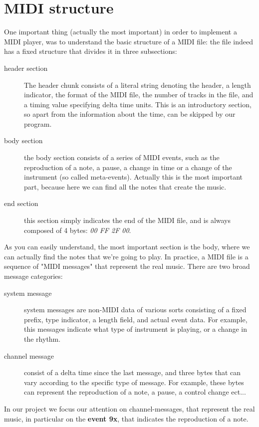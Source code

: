 \documentclass[12pt]{article}
\begin{document}
\section{MIDI structure} \label{sec:structure}
One important thing (actually the most important) in order to implement a MIDI player, was to understand the basic structure of a MIDI file: the file indeed has a fixed structure that divides it in three subsections: 
\begin{description} 
	\item[header section] The header chunk consists of a literal string denoting the header, a length indicator, the format of the MIDI file, the number of tracks in the file, and a timing value specifying delta time units. This is an introductory section, so apart from the information about the time, can be skipped by our program.
	\item[body section] the body section consists of a series of MIDI events, such as the reproduction of a note, a pause, a change in time or a change of the instrument (so called meta-events). Actually this is the most important part, because here we can find all the notes that create the music.
	\item[end section] this section simply indicates the end of the MIDI file, and is always composed of 4 bytes: \emph{00 FF 2F 00}.
\end{description}
As you can easily understand, the most important section is the body, where we can actually find the notes that we're going to play. In practice, a MIDI file is a sequence of "MIDI messages" that represent the real music.\newline 
There are two broad message categories: 
\begin{description} 
	\item[system message] system messages are non-MIDI data of various sorts consisting of a fixed prefix, type indicator, a length field, and actual event data. For example, this messages indicate what type of instrument is playing, or a change in the rhythm.
	\item[channel message] consist of a delta time since the last message, and three bytes that can vary according to the specific type of message. For example, these bytes can represent the reproduction of a note, a pause, a control change ect...
\end{description}
In our project we focus our attention on channel-messages, that represent the real music, in particular on the \textbf{event 9x}, that indicates the reproduction of a note.
\end{document}
